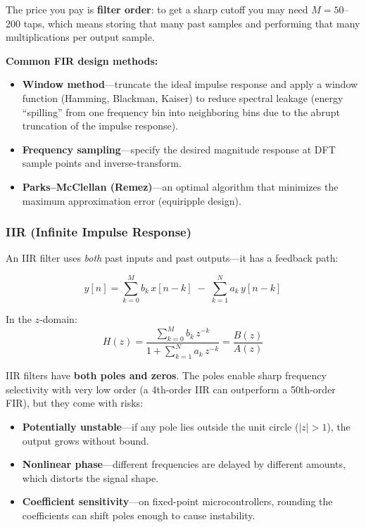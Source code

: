 The price you pay is \textbf{filter order}: to get a sharp cutoff you may need
$M = 50$--$200$ taps, which means storing that many past samples and performing
that many multiplications per output sample.

\textbf{Common FIR design methods:}
\begin{itemize}
    \item \textbf{Window method}---truncate the ideal impulse response and apply a
          window function (Hamming, Blackman, Kaiser) to reduce spectral leakage (energy ``spilling'' from one frequency bin into neighboring bins due to the abrupt truncation of the impulse response).
    \item \textbf{Frequency sampling}---specify the desired magnitude response at
          DFT sample points and inverse-transform.
    \item \textbf{Parks--McClellan (Remez)}---an optimal algorithm that minimizes
          the maximum approximation error (equiripple design).
\end{itemize}

\subsubsection{IIR (Infinite Impulse Response)}

An IIR filter uses \textit{both} past inputs and past outputs---it has a feedback path:

\begin{equation}
y[n] = \sum_{k=0}^{M} b_k \, x[n-k] \;-\; \sum_{k=1}^{N} a_k \, y[n-k]
\end{equation}

In the $z$-domain:
\begin{equation}
H(z) = \frac{\displaystyle\sum_{k=0}^{M} b_k \, z^{-k}}
            {1 + \displaystyle\sum_{k=1}^{N} a_k \, z^{-k}}
     = \frac{B(z)}{A(z)}
\end{equation}

IIR filters have \textbf{both poles and zeros}. The poles enable sharp frequency
selectivity with very low order (a 4th-order IIR can outperform a 50th-order FIR),
but they come with risks:
\begin{itemize}
    \item \textbf{Potentially unstable}---if any pole lies outside the unit circle
          ($|z| > 1$), the output grows without bound.
    \item \textbf{Nonlinear phase}---different frequencies are delayed by different
          amounts, which distorts the signal shape.
    \item \textbf{Coefficient sensitivity}---on fixed-point microcontrollers,
          rounding the coefficients can shift poles enough to cause instability.
\end{itemize}


